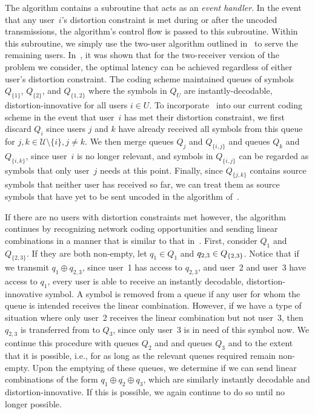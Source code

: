 The algorithm contains a subroutine that acts as an \emph{event handler}.  In the event that any user~$i$'s distortion constraint is met during or after the uncoded transmissions, the algorithm's control flow is passed to this subroutine.  Within this subroutine, we simply use the two-user algorithm outlined in~\cite{TMKS_TIT20} to serve the remaining users.  In~\cite{TMKS_TIT20}, it was shown that for the two-receiver version of the problem we consider, the optimal latency can be achieved regardless of either user's distortion constraint.  The coding scheme maintained queues of symbols $Q_{\{1\}}$, $Q_{\{2\}}$, and $Q_{\{1, 2\}}$ where the symbols in $Q_U$ are instantly-decodable, distortion-innovative for all users $i \in U$.  To incorporate~\cite{TMKS_TIT20} into our current coding scheme in the event that user~$i$ has met their distortion constraint, we first discard $Q_i$ since users $j$ and $k$ have already received all symbols from this queue for $j, k \in \mathcal{U} \setminus\{i\}, j\neq k$.  We then merge queues $Q_j$ and $Q_{\{i, j\}}$ and queues $Q_k$ and $Q_{\{i, k\}}$, since user~$i$ is no longer relevant, and symbols in $Q_{\{i, j\}}$ can be regarded as symbols that only user~$j$ needs at this point.  Finally, since $Q_{\{j,k\}}$ contains source symbols that neither user has received so far, we can  treat them as source symbols that have yet to be sent uncoded in the algorithm of~\cite{TMKS_TIT20}.

If there are no users with distortion constraints met however, the algorithm continues by recognizing network coding opportunities and sending linear combinations in a manner that is similar to that in~\cite{TMKS_TIT20}.  First, consider $Q_1$ and $Q_{\{2, 3\}}$.  If they are both non-empty, let $q_1 \in Q_1$ and $q_{2,3} \in Q_{\{2,3\}}$.  Notice that if we transmit $q_1 \oplus q_{2,3}$, since user~1 has access to $q_{2,3}$, and user~2 and user~3 have access to $q_1$, every user is able to receive an instantly decodable, distortion-innovative symbol.  A symbol is removed from a queue if any user for whom the queue is intended receives the linear combination.  However, if we have a type of situation where only user~2 receives the linear combination but not user~3, then $q_{2, 3}$ is transferred from  to $Q_3$, since only user~3 is in need of this symbol now.  We continue this procedure with queues $Q_2$ and  and queues $Q_3$ and  to the extent that it is possible, i.e., for as long as the relevant queues required remain non-empty. 
%
Upon the emptying of these queues, we determine if we can send linear combinations of the form $q_1 \oplus q_2 \oplus q_3$,  which are similarly instantly decodable and distortion-innovative.  If this is possible, we again continue to do so until no longer possible.

